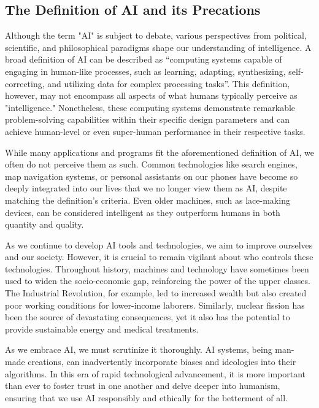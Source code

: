 \documentclass[letterpaper, 10pt, conference]{ieeeconf}
\begin{document}
    \subsection{The Definition of AI and its Precations}
    Although the term "AI" is subject to debate, various perspectives from political, scientific, and philosophical paradigms shape our understanding of intelligence. A broad definition of AI can be described as 
    \enquote{computing systems capable of engaging in human-like processes, such as learning, adapting, synthesizing, self-correcting, and utilizing data for complex processing tasks}\cite{popenici2017}.
    This definition, however, may not encompass all aspects of what humans typically perceive as "intelligence." Nonetheless, these computing systems demonstrate remarkable problem-solving capabilities within their specific design parameters and can achieve human-level or even super-human performance in their respective tasks.

    While many applications and programs fit the aforementioned definition of AI, we often do not perceive them as such. Common technologies like search engines, map navigation systems, or personal assistants on our phones have become so deeply integrated into our lives that we no longer view them as AI, despite matching the definition's criteria. Even older machines, such as lace-making devices, can be considered intelligent as they outperform humans in both quantity and quality.

    As we continue to develop AI tools and technologies, we aim to improve ourselves and our society. However, it is crucial to remain vigilant about who controls these technologies. Throughout history, machines and technology have sometimes been used to widen the socio-economic gap, reinforcing the power of the upper classes. The Industrial Revolution, for example, led to increased wealth but also created poor working conditions for lower-income laborers. Similarly, nuclear fission has been the source of devastating consequences, yet it also has the potential to provide sustainable energy and medical treatments.

    As we embrace AI, we must scrutinize it thoroughly. AI systems, being man-made creations, can inadvertently incorporate biases and ideologies into their algorithms. In this era of rapid technological advancement, it is more important than ever to foster trust in one another and delve deeper into humanism, ensuring that we use AI responsibly and ethically for the betterment of all.
\end{document}
